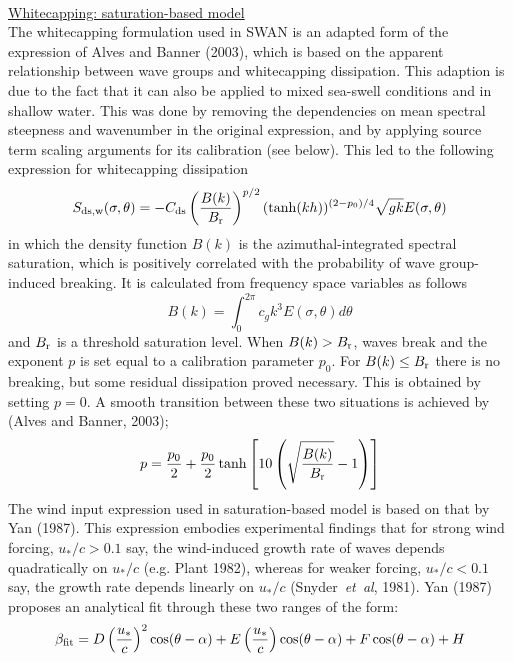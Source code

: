 \documentclass[12pt]{book}
\begin{document}
\nocite{Hur04V}
\\[2ex]
\noindent
\underline{Whitecapping: saturation-based model}\\[2ex]
The whitecapping formulation used in SWAN is an adapted form of the expression of Alves and Banner (2003), which is based
on the apparent relationship between wave groups and whitecapping dissipation. This adaption is due to the fact that it
can also be applied to mixed sea-swell conditions and in shallow water. This was done by removing the dependencies on mean
spectral steepness and wavenumber in the original expression, and by applying source term scaling arguments for its
calibration (see below). This led to the following expression for whitecapping dissipation
\begin{equation}
  S_{\rm ds,w} (\sigma,\theta) = -C_{\rm ds} \left( \frac{B(k)}{B_{\rm r}} \right)^{p/2} (\tanh(kh))^{(2-p_0)/4}
                                  \sqrt{gk} E(\sigma,\theta)
  \label{eq:satu}
\end{equation}
in which the density function $B(k)$ is the azimuthal-integrated spectral saturation, which is positively correlated with
the probability of wave group-induced breaking. It is calculated from frequency space variables as follows
\begin{equation}
  B(k) = \int_{0}^{2\pi} c_g k^3 E(\sigma,\theta) d\theta
\end{equation}
and $B_{\rm r}$ is a threshold saturation level. When $B(k) > B_{\rm r}$, waves break and the exponent $p$ is set equal
to a calibration parameter $p_0$. For $B(k) \leq B_{\rm r}$ there is no breaking, but some residual dissipation proved
necessary. This is obtained by setting $p = 0$. A smooth transition between these two situations is achieved by
(Alves and Banner, 2003);
\begin{equation}
  p = \frac{p_0}{2} + \frac{p_0}{2} \tanh \left[ 10 \left( \sqrt{\frac{B(k)}{B_{\rm r}}} - 1 \right) \right]
  \label{eq:expo}
\end{equation}
\noindent
The wind input expression used in saturation-based model is based on that by Yan (1987). This expression embodies experimental
findings that for strong wind forcing, $u_*/c > 0.1$ say, the wind-induced growth rate of waves depends quadratically on
$u_*/c$ (e.g. Plant 1982), whereas for weaker forcing, $u_*/c < 0.1$ say, the growth rate depends linearly on $u_*/c$
(Snyder~{\it et~al}, 1981). Yan (1987) proposes an analytical fit through these two ranges of the form:
\begin{equation}
  \beta_{\rm fit} = D \left( \frac{u_*}{c} \right)^2 \cos(\theta-\alpha) + E \left( \frac{u_*}{c} \right) \cos(\theta-\alpha) +
                    F \cos(\theta-\alpha) + H
  \label{eq:yan}
\end{equation}
\end{document}

